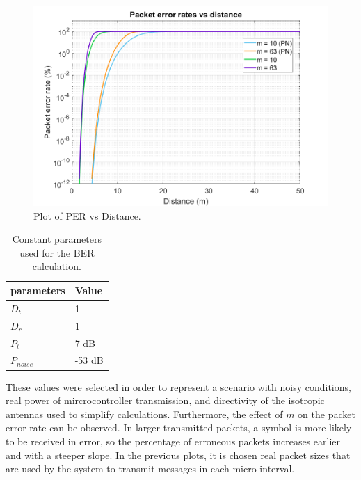 \documentclass[journal]{IEEEtran}	%
\begin{document}
\begin{figure}[t!]
\centering
\includegraphics[width=0.99\columnwidth]{distance2.png}
\caption{Plot of PER vs Distance.}
\label{fig:distance}
\end{figure}

\begin{table}[h!]
    \renewcommand{\arraystretch}{1.25}		%
    \centering
    \caption{Constant parameters used for the BER calculation.}	%
    \label{tab:variables}
    \begin{tabular}{l|l}					%
    \hline \hline
    \textbf{parameters}        &    \textbf{Value}\\
    \hline
    $D_{t}$          &   1\\
    $D_{r}$          &   1\\
    $P_{t}$          &   7 dB\\
    $P_{noise}$      &   -53 dB\\
    \hline \hline
    \end{tabular}
\end{table}

These values were selected in order to represent a scenario with noisy conditions, real power of mircrocontroller transmission, and directivity of the isotropic antennas used to simplify calculations. Furthermore, the effect of $m$ on the packet error rate can be observed. In larger transmitted packets, a symbol is more likely to be received in error, so the percentage of erroneous packets increases earlier and with a steeper slope. In the previous plots, it is chosen real packet sizes that are used by the system to transmit messages in each micro-interval.
\end{document}
